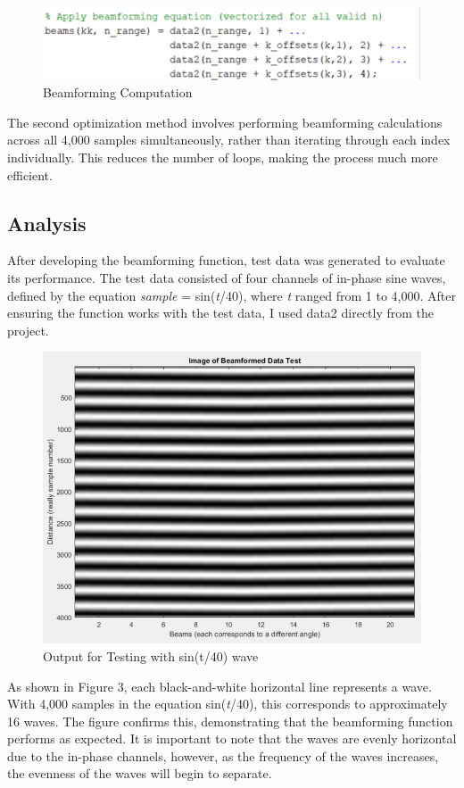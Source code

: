\begin{figure}[H]
    \centering
    \includegraphics[width=0.5\linewidth]{figures/beamform_fig2.png}
    \caption{Beamforming Computation}
    \label{fig:beamforming_computation}
\end{figure}

The second optimization method involves performing beamforming calculations across all 4,000 samples simultaneously, rather than iterating through each index individually. This reduces the number of loops, making the process much more efficient.



\subsection{Analysis}

After developing the beamforming function, test data was generated to evaluate its performance. The test data consisted of four channels of in-phase sine waves, defined by the equation \textit{sample} = sin(\textit{t}/40), where \textit{t} ranged from 1 to 4,000. After ensuring the function works with the test data, I used data2 directly from the project.

\begin{figure}[H]
    \centering
    \includegraphics[width=0.5\linewidth]{figures/beamform_fig3.png}
    \caption{Output for Testing with sin(t/40) wave}
    \label{fig:sinwave_output}
\end{figure}

As shown in Figure 3, each black-and-white horizontal line represents a wave. With 4,000 samples in the equation sin(\textit{t}/40), this corresponds to approximately 16 waves. The figure confirms this, demonstrating that the beamforming function performs as expected. It is important to note that the waves are evenly horizontal due to the in-phase channels, however, as the frequency of the waves increases, the evenness of the waves will begin to separate.

